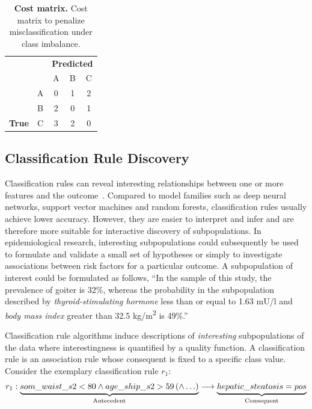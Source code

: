\documentclass[
  oneside]{book}
\begin{document}
\begin{table}

\caption{\label{tab:03-costmatrix}\textbf{Cost matrix.} Cost matrix to penalize misclassification under class imbalance.}
\centering
\begin{tabular}[t]{>{}ccccc}
\toprule
\multicolumn{2}{c}{\textbf{ }} & \multicolumn{3}{c}{\textbf{Predicted}} \\
\cmidrule(l{3pt}r{3pt}){3-5}
   &   & A & B & C\\
\midrule
 & A & 0 & 1 & 2\\

 & B & 2 & 0 & 1\\

\multirow{-3}{*}{\centering\arraybackslash \textbf{True}} & C & 3 & 2 & 0\\
\bottomrule
\end{tabular}
\end{table}

\hypertarget{imm-workflow-rule-discovery}{%
\subsection{Classification Rule Discovery}\label{imm-workflow-rule-discovery}}

Classification rules can reveal interesting relationships between one or more features and the outcome~\autocite{Fuernkranz:12,Herrera11}.
Compared to model families such as deep neural networks, support vector machines and random forests, classification rules usually achieve lower accuracy.
However, they are easier to interpret and infer and are therefore more suitable for interactive discovery of subpopulations.
In epidemiological research, interesting subpopulations could subsequently be used to formulate and validate a small set of hypotheses or simply to investigate associations between risk factors for a particular outcome.
A subpopulation of interest could be formulated as follows, ``In the sample of this study, the prevalence of goiter is 32\%, whereas the probability in the subpopulation described by \emph{thyroid-stimulating hormone} less than or equal to 1.63 mU/l and \emph{body mass index} greater than 32.5 kg/m\textsuperscript{2} is 49\%.''

Classification rule algorithms induce descriptions of \emph{interesting} subpopulations of the data where interestingness is quantified by a quality function.
A classification rule is an association rule whose consequent is fixed to a specific class value.
Consider the exemplary classification rule \(r_1\):
\begin{equation}
r_1: \underbrace{som\_waist\_s2 < 80 \wedge age\_ship\_s2 > 59 \left(\wedge \ldots \right)}_{\text{Antecedent}} \longrightarrow \underbrace{\vphantom{som\_waist\_s2 < 80 \wedge age\_ship\_s2 > 59 \left(\wedge \ldots \right)}hepatic\_steatosis = pos}_{\text{Consequent}}
\label{eq:03-rule}
\end{equation}
\end{document}
